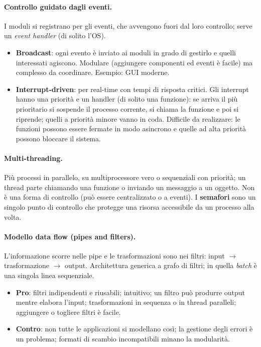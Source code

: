 \documentclass[a4paper,12pt]{article}
\begin{document}
\paragraph{Controllo guidato dagli eventi.} I moduli si registrano per gli eventi, che
avvengono fuori dal loro controllo; serve un \emph{event handler} (di solito l'OS).
\begin{itemize}
  \item \textbf{Broadcast}: ogni evento è inviato ai moduli in grado di gestirlo e quelli
        interessati agiscono. Modulare (aggiungere componenti ed eventi è facile) ma
        complesso da coordinare. Esempio: GUI moderne.
  \item \textbf{Interrupt-driven}: per real-time con tempi di risposta critici. Gli
        interrupt hanno una priorità e un handler (di solito una funzione): se arriva il
        più prioritario si sospende il processo corrente, si chiama la funzione e poi si
        riprende; quelli a priorità minore vanno in coda. Difficile da realizzare: le
        funzioni possono essere fermate in modo asincrono e quelle ad alta priorità
        possono bloccare il sistema.
\end{itemize}

\paragraph{Multi-threading.} Più processi in parallelo, su multiprocessore vero o
sequenziali con priorità; un thread parte chiamando una funzione o inviando un messaggio
a un oggetto. Non è una forma di controllo (può essere centralizzato o a eventi). I
\textbf{semafori} sono un singolo punto di controllo che protegge una risorsa accessibile
da un processo alla volta.

\paragraph{Modello data flow (pipes and filters).} L'informazione scorre nelle pipe e le
trasformazioni sono nei filtri: input $\to$ trasformazione $\to$ output. Architettura
generica a grafo di filtri; in quella \emph{batch} è una singola linea sequenziale.
\begin{itemize}
  \item \textbf{Pro}: filtri indipendenti e riusabili; intuitivo; un filtro può produrre
        output mentre elabora l'input; trasformazioni in sequenza o in thread paralleli;
        aggiungere o togliere filtri è facile.
  \item \textbf{Contro}: non tutte le applicazioni si modellano così; la gestione degli
        errori è un problema; formati di scambio incompatibili minano la modularità.
\end{itemize}
\end{document}
